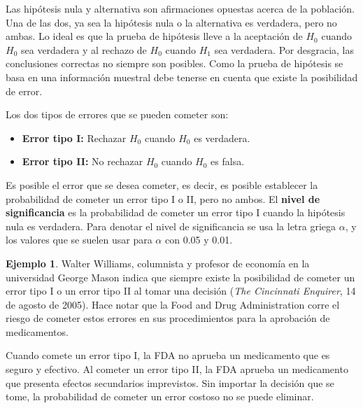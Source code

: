 \documentclass[
  11pt,
]{book}
\providecommand{\tightlist}{%
  \setlength{\itemsep}{0pt}\setlength{\parskip}{0pt}}
\theoremstyle{definition}
\theoremstyle{definition}
\newtheorem{example}{Ejemplo}[chapter]
\theoremstyle{definition}
\theoremstyle{definition}
\theoremstyle{remark}
\begin{document}
Las hipótesis nula y alternativa son afirmaciones opuestas acerca de la población. Una de las dos, ya sea la hipótesis nula o la alternativa es verdadera, pero no ambas. Lo ideal es que la prueba de hipótesis lleve a la aceptación de \(H_0\) cuando \(H_0\) sea verdadera y al rechazo de \(H_0\) cuando \(H_1\) sea verdadera. Por desgracia, las conclusiones correctas no siempre son posibles. Como la prueba de hipótesis se basa en una información muestral debe tenerse en cuenta que existe la posibilidad de error.

Los dos tipos de errores que se pueden cometer son:

\begin{itemize}
\tightlist
\item
  \textbf{Error tipo I:} Rechazar \(H_0\) cuando \(H_0\) es verdadera.
\item
  \textbf{Error tipo II:} No rechazar \(H_0\) cuando \(H_0\) es falsa.
\end{itemize}

Es posible el error que se desea cometer, es decir, es posible establecer la probabilidad de cometer un error tipo I o II, pero no ambos. El \textbf{nivel de significancia} es la probabilidad de cometer un error tipo I cuando la hipótesis nula es verdadera. Para denotar el nivel de significancia se usa la letra griega \(\alpha\), y los valores que se suelen usar para \(\alpha\) con 0.05 y 0.01.

\begin{example}
Walter Williams, columnista y profesor de economía en la universidad George Mason indica que siempre existe la posibilidad de cometer un error tipo I o un error tipo II al tomar una decisión (\emph{The Cincinnati Enquirer}, 14 de agosto de 2005). Hace notar que la Food and Drug Administration corre el riesgo de cometer estos errores en sus procedimientos para la aprobación de medicamentos.

Cuando comete un error tipo I, la FDA no aprueba un medicamento que es seguro y efectivo. Al cometer un error tipo II, la FDA aprueba un medicamento que presenta efectos secundarios imprevistos. Sin importar la decisión que se tome, la probabilidad de cometer un error costoso no se puede eliminar.
\end{example}
\end{document}
